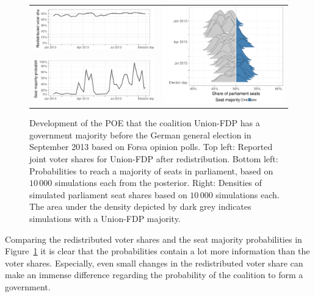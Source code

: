 \documentclass[smallcondensed]{svjour3}     %
\begin{document}
\begin{figure}[H]\centering
\begin{tabular}{ll}
\includegraphics[height=.15\textwidth]{figures/2013_forsa_cdufdp_rawSharesRedist.pdf}
&
\multirow{2}{*}[13ex]{\includegraphics[height=30ex]{figures/2013_forsa_cdufdp_ridgeline.pdf}}
\\
\includegraphics[height=.15\textwidth]{figures/2013_forsa_cdufdp_prob.pdf}
\end{tabular}
\caption{Development of the POE that the coalition Union-FDP has a government majority before the German general election in September 2013 based on Forsa opinion polls.
Top left: Reported joint voter shares for Union-FDP after redistribution.
Bottom left: Probabilities to reach a majority of seats in parliament, based on
$10\,000$ simulations each from the posterior.
Right: Densities of simulated parliament seat shares based on $10\,000$ simulations each.
The area under the density depicted by dark grey indicates simulations with a
Union-FDP majority.
\label{fig:seatDist_time}
}
\end{figure}

Comparing the redistributed voter shares and the seat majority probabilities
in Figure~\ref{fig:seatDist_time} it is clear that the probabilities contain
a lot more information than the voter shares. Especially, even small changes
in the redistributed voter share can make an immense difference regarding the
probability of the coalition to form a government.\\
\end{document}
